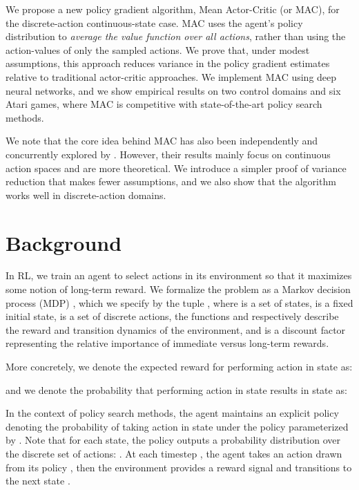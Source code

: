 \documentclass[letterpaper]{article}
\begin{document}
We propose a new policy gradient algorithm, Mean Actor-Critic (or MAC), for the discrete-action continuous-state case. MAC uses the agent's policy distribution to \textit{average the value function over all actions}, rather than using the action-values of only the sampled actions. We prove that, under modest assumptions, this approach reduces variance in the policy gradient estimates relative to traditional actor-critic approaches. We implement MAC using deep neural networks, and we show empirical results on two control domains and six Atari games, where MAC is competitive with state-of-the-art policy search methods.

We note that the core idea behind MAC has also been independently and concurrently explored by \citeauthor{ciosek2017expected} . However, their results mainly focus on continuous action spaces and are more theoretical. We introduce a simpler proof of variance reduction that makes fewer assumptions, and we also show that the algorithm works well in discrete-action domains.






\section{Background}
In RL, we train an agent to select actions in its environment so that it maximizes some notion of long-term reward. We formalize the problem as a Markov decision process (MDP) \cite{puterman1990markov}, which we specify by the tuple , where  is a set of states,  is a fixed initial state,  is a set of discrete actions, the functions  and
 respectively describe the reward and transition dynamics of the environment, and  is a discount factor representing the relative importance of immediate versus long-term rewards.

More concretely, we denote the expected reward for performing action  in state  as:

and we denote the probability that performing action  in state  results in state  as:


In the context of policy search methods, the agent maintains an explicit policy  denoting the probability of taking action  in state  under the policy  parameterized by . Note that for each state, the policy outputs a probability distribution over the discrete set of actions: . At each timestep , the agent takes an action  drawn from its policy , then the environment provides a reward signal  and transitions to the next state .
\end{document}
